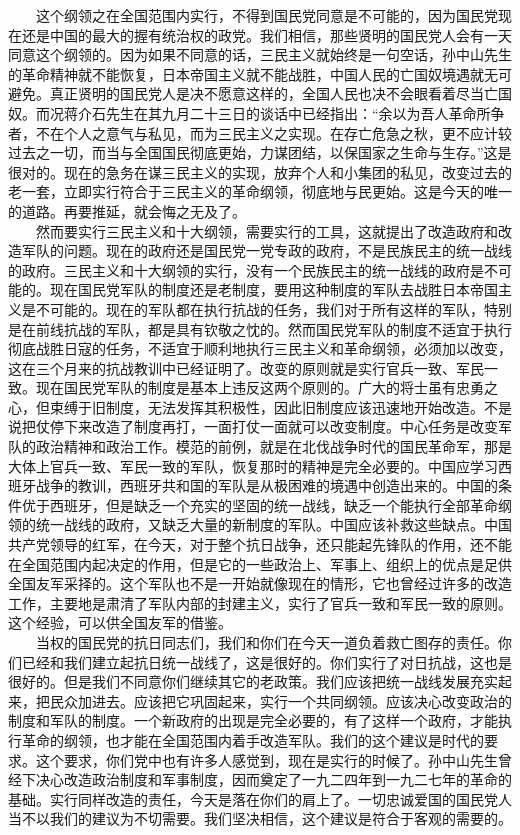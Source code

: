 \documentclass[cn,11pt,chinese]{elegantbook}
\begin{document}
　　这个纲领之在全国范围内实行，不得到国民党同意是不可能的，因为国民党现在还是中国的最大的握有统治权的政党。我们相信，那些贤明的国民党人会有一天同意这个纲领的。因为如果不同意的话，三民主义就始终是一句空话，孙中山先生的革命精神就不能恢复，日本帝国主义就不能战胜，中国人民的亡国奴境遇就无可避免。真正贤明的国民党人是决不愿意这样的，全国人民也决不会眼看着尽当亡国奴。而况蒋介石先生在其九月二十三日的谈话中已经指出：“余以为吾人革命所争者，不在个人之意气与私见，而为三民主义之实现。在存亡危急之秋，更不应计较过去之一切，而当与全国国民彻底更始，力谋团结，以保国家之生命与生存。”这是很对的。现在的急务在谋三民主义的实现，放弃个人和小集团的私见，改变过去的老一套，立即实行符合于三民主义的革命纲领，彻底地与民更始。这是今天的唯一的道路。再要推延，就会悔之无及了。\\
　　然而要实行三民主义和十大纲领，需要实行的工具，这就提出了改造政府和改造军队的问题。现在的政府还是国民党一党专政的政府，不是民族民主的统一战线的政府。三民主义和十大纲领的实行，没有一个民族民主的统一战线的政府是不可能的。现在国民党军队的制度还是老制度，要用这种制度的军队去战胜日本帝国主义是不可能的。现在的军队都在执行抗战的任务，我们对于所有这样的军队，特别是在前线抗战的军队，都是具有钦敬之忱的。然而国民党军队的制度不适宜于执行彻底战胜日寇的任务，不适宜于顺利地执行三民主义和革命纲领，必须加以改变，这在三个月来的抗战教训中已经证明了。改变的原则就是实行官兵一致、军民一致。现在国民党军队的制度是基本上违反这两个原则的。广大的将士虽有忠勇之心，但束缚于旧制度，无法发挥其积极性，因此旧制度应该迅速地开始改造。不是说把仗停下来改造了制度再打，一面打仗一面就可以改变制度。中心任务是改变军队的政治精神和政治工作。模范的前例，就是在北伐战争时代的国民革命军，那是大体上官兵一致、军民一致的军队，恢复那时的精神是完全必要的。中国应学习西班牙战争的教训，西班牙共和国的军队是从极困难的境遇中创造出来的。中国的条件优于西班牙，但是缺乏一个充实的坚固的统一战线，缺乏一个能执行全部革命纲领的统一战线的政府，又缺乏大量的新制度的军队。中国应该补救这些缺点。中国共产党领导的红军，在今天，对于整个抗日战争，还只能起先锋队的作用，还不能在全国范围内起决定的作用，但是它的一些政治上、军事上、组织上的优点是足供全国友军采择的。这个军队也不是一开始就像现在的情形，它也曾经过许多的改造工作，主要地是肃清了军队内部的封建主义，实行了官兵一致和军民一致的原则。这个经验，可以供全国友军的借鉴。\\
　　当权的国民党的抗日同志们，我们和你们在今天一道负着救亡图存的责任。你们已经和我们建立起抗日统一战线了，这是很好的。你们实行了对日抗战，这也是很好的。但是我们不同意你们继续其它的老政策。我们应该把统一战线发展充实起来，把民众加进去。应该把它巩固起来，实行一个共同纲领。应该决心改变政治的制度和军队的制度。一个新政府的出现是完全必要的，有了这样一个政府，才能执行革命的纲领，也才能在全国范围内着手改造军队。我们的这个建议是时代的要求。这个要求，你们党中也有许多人感觉到，现在是实行的时候了。孙中山先生曾经下决心改造政治制度和军事制度，因而奠定了一九二四年到一九二七年的革命的基础。实行同样改造的责任，今天是落在你们的肩上了。一切忠诚爱国的国民党人当不以我们的建议为不切需要。我们坚决相信，这个建议是符合于客观的需要的。\\
\end{document}
